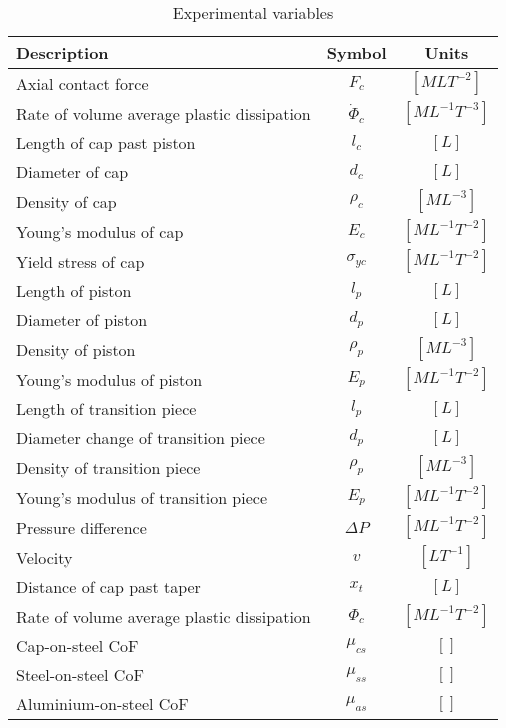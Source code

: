 \documentclass{article}%
\begin{document}
%
\normalsize%


\begin{table}[!htb]%
\centering%
\caption{Experimental variables}%
\label{tab:experimental-variables}%
\begin{tabular}{p{7cm} c c}%
\hline%
Description&Symbol&Units\\%
\hline%
\hline%
Axial contact force&$F_c$&$[MLT^{-2}]$\\%
Rate of volume average plastic dissipation&$\dot{\Phi}_{c}$&$[ML^{-1}T^{-3}]$\\%
Length of cap past piston&$l_c$&$[L]$\\%
Diameter of cap&$d_c$&$[L]$\\%
Density of cap&$\rho_c$&$[ML^{-3}]$\\%
Young's modulus of cap&$E_c$&$[ML^{-1}T^{-2}]$\\%
Yield stress of cap&$\sigma_{yc}$&$[ML^{-1}T^{-2}]$\\%
Length of piston&$l_p$&$[L]$\\%
Diameter of piston&$d_p$&$[L]$\\%
Density of piston&$\rho_p$&$[ML^{-3}]$\\%
Young's modulus of piston&$E_p$&$[ML^{-1}T^{-2}]$\\%
Length of transition piece&$l_p$&$[L]$\\%
Diameter change of transition piece&$d_p$&$[L]$\\%
Density of transition piece&$\rho_p$&$[ML^{-3}]$\\%
Young's modulus of transition piece&$E_p$&$[ML^{-1}T^{-2}]$\\%
Pressure difference&$\Delta P$&$[ML^{-1}T^{-2}]$\\%
Velocity&$v$&$[LT^{-1}]$\\%
Distance of cap past taper&$x_t$&$[L]$\\%
Rate of volume average plastic dissipation&$\Phi_{c}$&$[ML^{-1}T^{-2}]$\\%
Cap{-}on{-}steel CoF&$\mu_{cs}$&$[]$\\%
Steel{-}on{-}steel CoF&$\mu_{ss}$&$[]$\\%
Aluminium{-}on{-}steel CoF&$\mu_{as}$&$[]$\\%
\end{tabular}%
\end{table}

%
\end{document}
